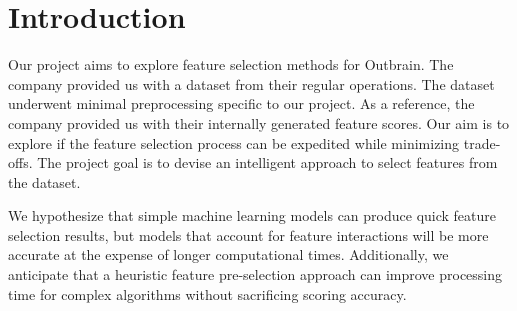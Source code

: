 \documentclass[fleqn,moreauthors,10pt]{ds_report}
\affiliation{\textit{Advisors: Jure Demšar, Blaž Mramor, Blaž Škrlj}}
\begin{document}
\flushbottom 

\maketitle 

\thispagestyle{empty} 


\section*{Introduction}

Our project aims to explore feature selection methods for Outbrain. The company provided us with a dataset from their regular operations. The dataset underwent minimal preprocessing specific to our project. As a reference, the company provided us with their internally generated feature scores. Our aim is to explore if the feature selection process can be expedited while minimizing trade-offs. The project goal is to devise an intelligent approach to select features from the dataset.

We hypothesize that simple machine learning models can produce quick feature selection results, but models that account for feature interactions will be more accurate at the expense of longer computational times. Additionally, we anticipate that a heuristic feature pre-selection approach can improve processing time for complex algorithms without sacrificing scoring accuracy. 

	
\end{document}
